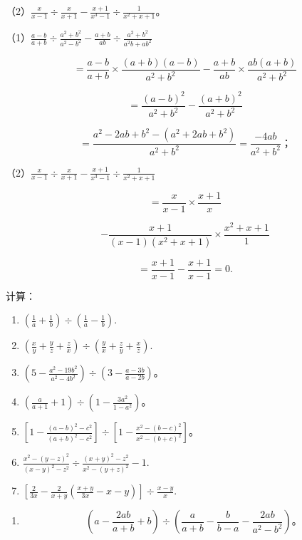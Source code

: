 （2）\(\frac{x}{x - 1} \div \frac{x}{x + 1} - \frac{x + 1}{x^3 - 1} \div \frac{1}{x^2 + x + 1}\)。

（1）\(\frac{a - b}{a + b} \div \frac{a^2 + b^2}{a^2 - b^2} - \frac{a + b}{ab} \div \frac{a^2 + b^2}{a^2b + ab^2}\)

\[
= \frac{a - b}{a + b} \times \frac{(a + b) (a - b)}{a ^{2} + b ^{2}} - \frac{a + b}{a b} \times \frac{a b (a + b)}{a ^{2} + b ^{2}}
\]

\[
= \frac{(a - b) ^{2}}{a ^{2} + b ^{2}} - \frac{(a + b) ^{2}}{a ^{2} + b ^{2}}
\]

\[
= \frac{a ^{2} - 2 a b + b ^{2} - (a ^{2} + 2 a b + b ^{2})}{a ^{2} + b ^{2}} = \frac{- 4 a b}{a ^{2} + b ^{2}}\text{；}
\]

（2）\(\frac{x}{x - 1} \div \frac{x}{x + 1} - \frac{x + 1}{x^3 - 1} \div \frac{1}{x^2 + x + 1}\)

\[
= \frac{x}{x - 1} \times \frac{x + 1}{x}
\]

\[
- \frac{x + 1}{(x - 1) (x ^{2} + x + 1)} \times \frac{x ^{2} + x + 1}{1}
\]

\[
= \frac{x + 1}{x - 1} - \frac{x + 1}{x - 1} = 0.
\]

计算：

\begin{enumerate}[start=1]
\item
  \(\left(\frac{1}{a} +\frac{1}{b}\right)\div \left(\frac{1}{a} -\frac{1}{b}\right).\)
\item
  \(\left(\frac{x}{y} +\frac{y}{z} +\frac{z}{x}\right)\div \left(\frac{y}{x} +\frac{z}{y} +\frac{x}{z}\right).\)
\item
  \(\left(5 - \frac{a^2 - 19b^2}{a^2 - 4b^2}\right) \div \left(3 - \frac{a - 3b}{a - 2b}\right)\)。
\item
  \(\left(\frac{a}{a + 1} + 1\right) \div \left(1 - \frac{3a^2}{1 - a^2}\right)\)。
\item
  \(\left[1 - \frac{(a - b)^2 - c^2}{(a + b)^2 - c^2}\right] \div \left[1 - \frac{x^2 - (b - c)^2}{x^2 - (b + c)^2}\right]\)。
\item
  \(\frac{x^2 - (y - z)^2}{(x - y)^2 - z^2} \div \frac{(x + y)^2 - z^2}{x^2 - (y + z)^2} - 1.\)
\item
  \(\left[\frac{2}{3x} -\frac{2}{x + y}\left(\frac{x + y}{3x} -x - y\right)\right]\div \frac{x - y}{x}.\)
\end{enumerate}

\begin{enumerate}[start=8]
\item
\[
\left(a - \frac{2 a b}{a + b} + b\right) \div \left(\frac{a}{a + b} - \frac{b}{b - a} - \frac{2 a b}{a ^{2} - b ^{2}}\right)\text{。}
\]
\end{enumerate}

